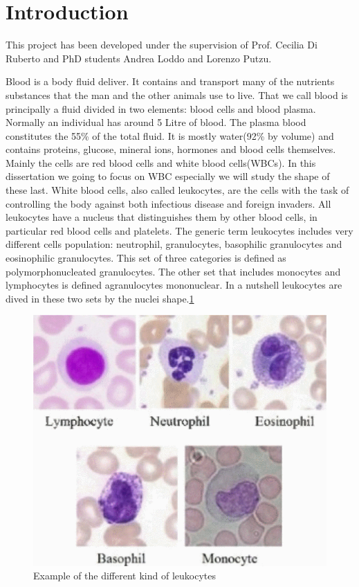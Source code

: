 
\chapter*{Introduction}
This project has been developed under the supervision of Prof. Cecilia Di Ruberto and PhD students Andrea Loddo and Lorenzo Putzu.

\bigskip


Blood is a body fluid deliver. It contains and transport many of the nutrients substances that the man and the other animals use to live. That we call blood is principally a fluid divided in two elements: blood cells and blood plasma. Normally an individual has around 5 Litre of blood. The plasma blood constitutes the 55\% of the total fluid. It is mostly water(92\% by volume) and contains proteins, glucose, mineral ions, hormones and blood cells themselves.\cite{website:wiki} Mainly the cells are red blood cells and white blood cells(WBCs). In this dissertation we going to focus on WBC especially we will study the shape of these last.
White blood cells, also called leukocytes, are the cells with the task of controlling the body against both infectious disease and foreign invaders. All leukocytes have a nucleus that distinguishes them by other blood cells, in particular red blood cells and platelets. The generic term leukocytes includes very different cells population: neutrophil, granulocytes, basophilic granulocytes and eosinophilic granulocytes. This set of three categories is defined as   polymorphonucleated granulocytes. The other set that includes monocytes and lymphocytes is defined agranulocytes mononuclear. In a nutshell leukocytes are dived in these two sets by the nuclei shape.\ref{fig:kindLeuko}
\begin{figure}
	\begin{center}
		\centering
		\includegraphics[scale=0.5]{img/leuko.png}
		\caption{Example of the different kind of leukocytes\cite{ann17}}
		\label{fig:kindLeuko}
	\end{center}
\end{figure}

